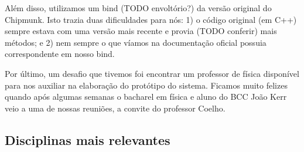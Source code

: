 Além disso, utilizamos um bind (TODO envoltório?) da versão original do Chipmunk. Isto trazia duas dificuldades para nós: 1) o código original (em C++) sempre estava com uma versão mais recente e provia (TODO conferir) mais métodos; e 2) nem sempre o que víamos na documentação oficial possuia correspondente em nosso bind. 
 
Por último, um desafio que tivemos foi encontrar um professor de física disponível para nos auxiliar na elaboração do protótipo do sistema. Ficamos muito felizes quando após algumas semanas o bacharel em física e aluno do BCC João Kerr veio a uma de nossas reuniões, a convite do professor Coelho.

\subsection{Disciplinas mais relevantes}

